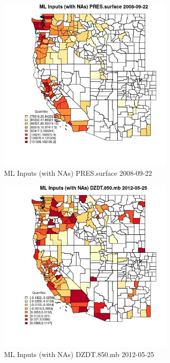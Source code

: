 \begin{figure} 
\centering  
\includegraphics[width=0.77\textwidth]{Code_Outputs/Report_ML_input_PM25_Step4_part_e_de_duplicated_aves_compiled_2019-05-18wNAs_CountyPRESsurfaceMean2008-09-22_2008-09-22.jpg} 
\caption{\label{fig:Report_ML_input_PM25_Step4_part_e_de_duplicated_aves_compiled_2019-05-18wNAsCountyPRESsurfaceMean2008-09-22_2008-09-22}ML Inputs (with NAs) PRES.surface 2008-09-22} 
\end{figure} 
 

\clearpage 

\begin{figure} 
\centering  
\includegraphics[width=0.77\textwidth]{Code_Outputs/Report_ML_input_PM25_Step4_part_e_de_duplicated_aves_compiled_2019-05-18wNAs_CountyDZDT850mbMean2012-05-25_2012-05-25.jpg} 
\caption{\label{fig:Report_ML_input_PM25_Step4_part_e_de_duplicated_aves_compiled_2019-05-18wNAsCountyDZDT850mbMean2012-05-25_2012-05-25}ML Inputs (with NAs) DZDT.850.mb 2012-05-25} 
\end{figure} 
 

